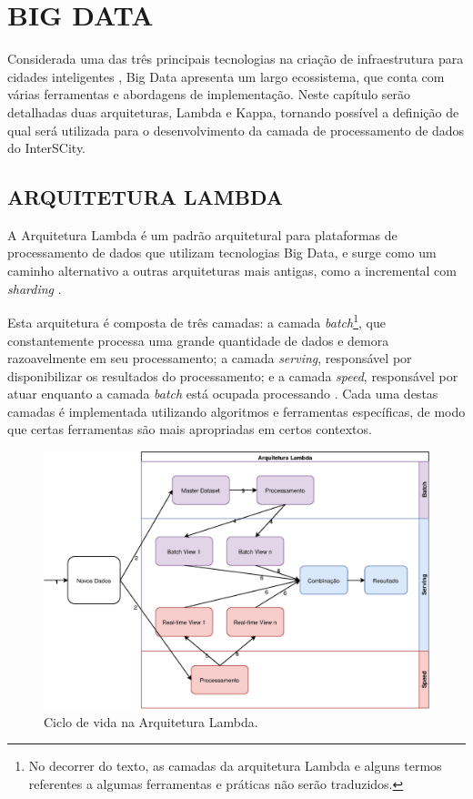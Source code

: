 \chapter[BIG DATA]{BIG DATA}

Considerada uma das três principais tecnologias na criação de infraestrutura
para cidades inteligentes \cite{kon2016}, Big Data apresenta um largo
ecossistema, que conta com várias ferramentas e abordagens de implementação.
Neste capítulo serão detalhadas duas arquiteturas, Lambda e Kappa, tornando
possível a definição de qual será utilizada para o desenvolvimento da camada
de processamento de dados do InterSCity.

\section{ARQUITETURA LAMBDA}

A Arquitetura Lambda é um padrão arquitetural para plataformas de processamento
de dados que utilizam tecnologias Big Data, e surge como um caminho alternativo a
outras arquiteturas mais antigas, como a incremental com \textit{sharding}
\cite{marz2015}.

Esta arquitetura é composta de três camadas: a camada
\textit{batch}\footnote{No decorrer do texto, as camadas da arquitetura Lambda e alguns
termos referentes a algumas ferramentas e práticas não serão traduzidos.}, que
constantemente processa uma grande quantidade de dados e demora razoavelmente
em seu processamento; a camada \textit{serving}, responsável por disponibilizar
os resultados do processamento; e a camada \textit{speed}, responsável por
atuar enquanto a camada \textit{batch} está ocupada processando
\cite{marz2015}. Cada uma destas camadas é implementada utilizando algoritmos e
ferramentas específicas, de modo que certas ferramentas são mais apropriadas em
certos contextos.

\begin{figure}
  \centering
    \includegraphics[width=\textwidth]{figuras/lambda-lifecycle.eps}
  \caption{Ciclo de vida na Arquitetura Lambda.}
  \label{fig:lambda-lifecycle}
\end{figure}

